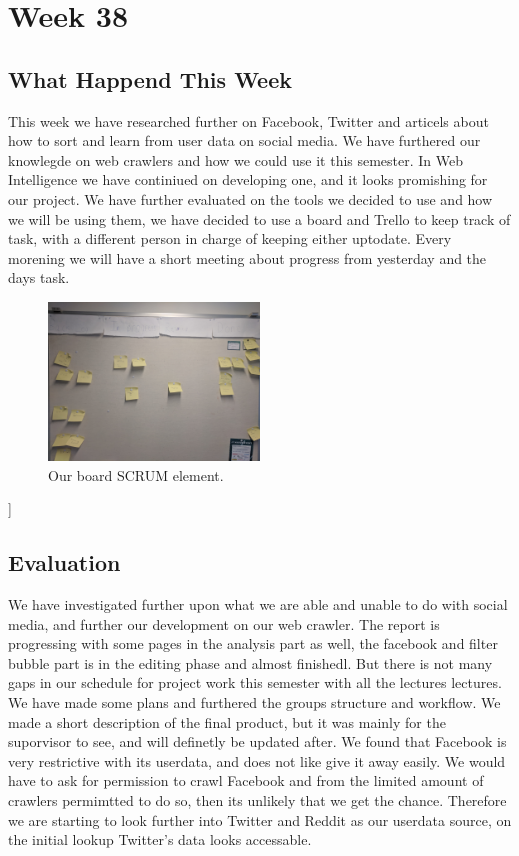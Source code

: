 \section*{Week 38}
\subsection*{What Happend This Week}
This week we have researched further on Facebook, Twitter and articels about
how to sort and learn from user data on social media. We have furthered our
knowlegde on web crawlers and how we could use it this semester. In Web
Intelligence we have continiued on developing one, and it looks promishing for
our project. We have further evaluated on the tools we decided to use and how we
will be using them, we have decided to use a board and Trello to keep track of
task, with a different person in charge of keeping either uptodate. Every
morening we will have a short meeting about progress from yesterday and the days
task.
\begin{figure}[H]
	\centering
	\includegraphics[width = 0.5\textwidth]{figures/Board.jpg}
	\caption{Our board SCRUM element.}
\end{figure}]

\subsection*{Evaluation}
We have investigated further upon what we are able and unable to do with social
media, and further our development on our web crawler. The report is
progressing with some pages in the analysis part as well, the facebook and
filter bubble part is in the editing phase and almost finishedl.
But there is not many gaps in our schedule for project work this semester with
all the lectures lectures.
We have made some plans and furthered the groups structure and workflow.
We made a short description of the final product, but it was mainly for the
suporvisor to see, and will definetly be updated after.
We found that Facebook is very restrictive with its userdata, and does not like
give it away easily. We would have to ask for permission to crawl Facebook and
from the limited amount of crawlers permimtted to do so, then its unlikely that
we get the chance. Therefore we are starting to look further into Twitter and
Reddit as our userdata source, on the initial lookup Twitter's data looks
accessable. 

